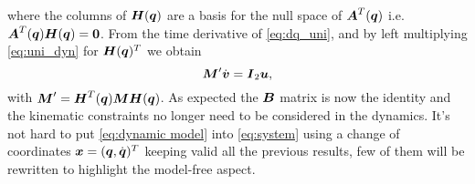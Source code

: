 where the columns of $\boldsymbol{H}({\boldsymbol{q}})$ are a basis for the null space of $\boldsymbol{A}^T({\boldsymbol{q}})$ i.e.  $\boldsymbol{A}^T({\boldsymbol{q}})\boldsymbol{H}({\boldsymbol{q}})=\boldsymbol{0}$. 
From the time derivative of \eqref{eq:dq_uni}, and by left multiplying \eqref{eq:uni_dyn} for $\boldsymbol{H}({\boldsymbol{q}})^T$ we obtain
\begin{equation}\label{eq:uni_dynamic}
    \boldsymbol{M}' \dot{\boldsymbol{v}} = \boldsymbol{I}_2\boldsymbol{u},
\end{equation}
with $\boldsymbol{M}' = \boldsymbol{H}^T({\boldsymbol{q}}) \boldsymbol{M} \boldsymbol{H}({\boldsymbol{q}})$. As expected the $\boldsymbol{B}$ matrix is now the identity and the kinematic constraints no longer need to be considered in the dynamics.
It's not hard to put \eqref{eq:dynamic model} into \eqref{eq:system} using a change of coordinates $\boldsymbol{x} = ({\boldsymbol{q}}, \dot{\boldsymbol{q}})^T$ keeping valid all the previous results, few of them will be rewritten to highlight the model-free aspect.

